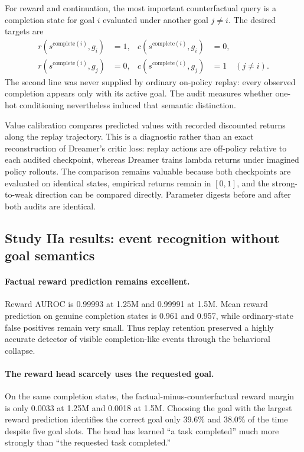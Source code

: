 \documentclass[10pt]{article}
\newcommand{\pct}[1]{#1\%}
\begin{document}
For reward and continuation, the most important counterfactual query is a completion state for goal $i$ evaluated under another goal $j\neq i$. The desired targets are
\begin{align}
  r(s^{\mathrm{complete}(i)},g_i)&=1, &
  c(s^{\mathrm{complete}(i)},g_i)&=0,\\
  r(s^{\mathrm{complete}(i)},g_j)&=0, &
  c(s^{\mathrm{complete}(i)},g_j)&=1 \quad (j\neq i).
  \label{eq:counterfactualtargets}
\end{align}
The second line was never supplied by ordinary on-policy replay: every observed completion appears only with its active goal. The audit measures whether one-hot conditioning nevertheless induced that semantic distinction.

Value calibration compares predicted values with recorded discounted returns along the replay trajectory. This is a diagnostic rather than an exact reconstruction of Dreamer's critic loss: replay actions are off-policy relative to each audited checkpoint, whereas Dreamer trains lambda returns under imagined policy rollouts. The comparison remains valuable because both checkpoints are evaluated on identical states, empirical returns remain in $[0,1]$, and the strong-to-weak direction can be compared directly. Parameter digests before and after both audits are identical.

\subsection{Study IIa results: event recognition without goal semantics}

\paragraph{Factual reward prediction remains excellent.}
Reward AUROC is 0.99993 at 1.25M and 0.99991 at 1.5M. Mean reward prediction on genuine completion states is 0.961 and 0.957, while ordinary-state false positives remain very small. Thus replay retention preserved a highly accurate detector of visible completion-like events through the behavioral collapse.

\paragraph{The reward head scarcely uses the requested goal.}
On the same completion states, the factual-minus-counterfactual reward margin is only 0.0033 at 1.25M and 0.0018 at 1.5M. Choosing the goal with the largest reward prediction identifies the correct goal only \pct{39.6} and \pct{38.0} of the time despite five goal slots. The head has learned ``a task completed'' much more strongly than ``the requested task completed.''
\end{document}
